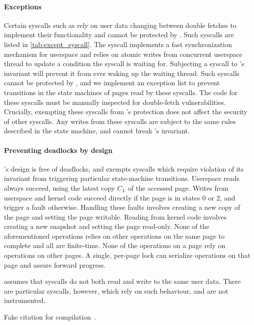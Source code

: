 \documentclass[letterpaper,twocolumn,10pt, anonymous]{article}
\begin{document}
\paragraph{Exceptions}
Certain syscalls such as  rely on user data changing between 
double fetches to implement their functionality and cannot be protected by
\tiktok.
Such syscalls are listed in \autoref{tab:except_syscall}.
The  syscall implements a fast synchronization mechanism
for userspace and relies on atomic writes from concurrent userspace
thread to update a condition the syscall is waiting for. 
Subjecting a  syscall to \tiktok's invariant will prevent
it from ever waking up the waiting thread.
Such syscalls cannot be protected by \tiktok, and we implement an 
exception list to prevent transitions in the state machines of pages read 
by these syscalls.
The code for these syscalls must be manually inspected for double-fetch 
vulnerabilities.
Crucially, exempting these syscalls from \tiktok's protection does not 
affect the security of other syscalls. 
Any writes from these syscalls are subject to the same rules described
in the state machine, and cannot break \tiktok's invariant.

\paragraph{Preventing deadlocks by design}
\tiktok's design is free of deadlocks, and exempts syscalls which 
require violation of its invariant from triggering particular 
state-machine transitions.
Userspace reads always succeed, using the latest copy $C_L$ of the
accessed page.
Writes from userspace and kernel code succeed directly if the 
page is in states 0 or 2, and trigger a fault otherwise.
Handling these faults involves creating a new copy of the page and
setting the page writable. 
Reading from kernel code involves creating a new snapshot and 
setting the page read-only.
None of the aforementioned operations relies on other operations 
on the same page to complete and all are finite-time.
None of the operations on a page rely on operations on other pages.
A single, per-page lock can serialize operations on that page
and assure forward progress.


\tiktok assumes that syscalls do not both read and write to the same user data. 
There are particular syscalls, however, which rely on such behaviour, and 
are not instrumented.


Fake citation for compilation~\cite{silberschatz2018operating}.




\end{document}
